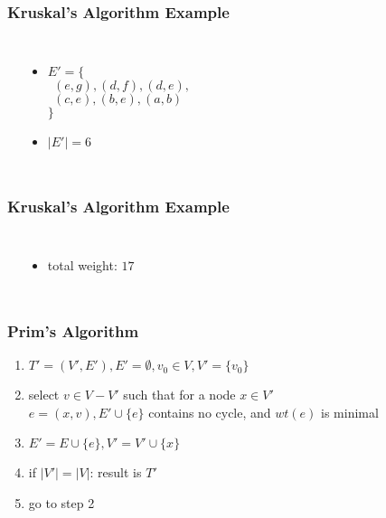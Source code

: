 \documentclass[dvipsnames]{beamer}
\begin{document}
\begin{frame}
  \frametitle{Kruskal's Algorithm Example}

  \begin{columns}
    \begin{center}
    \end{center}

    \pause
    \begin{itemize}
      \item $E' = \{$\\
        $~~(e,g), (d,f), (d,e),$\\
        $~~(c,e), (b,e), (a,b)$\\
        $\}$
      \item $|E'| = 6$
    \end{itemize}
  \end{columns}
\end{frame}

\begin{frame}
  \frametitle{Kruskal's Algorithm Example}

  \begin{columns}
    \begin{center}
    \end{center}

    \begin{itemize}
      \item total weight: $17$
    \end{itemize}
  \end{columns}
\end{frame}

\begin{frame}
  \frametitle{Prim's Algorithm}

  \begin{enumerate}
    \item $T'=(V',E'), E'=\emptyset, v_0 \in V, V'=\{v_0\}$
    \item select $v \in V-V'$ such that for a node $x \in V'$\\
      $e=(x,v), E' \cup \{e\}$ contains no cycle, and $wt(e)$ is minimal
    \item $E'=E \cup \{e\}, V'=V' \cup \{x\}$
    \item if $|V'|=|V|$: result is $T'$
    \item go to step 2
  \end{enumerate}
\end{frame}
\end{document}
